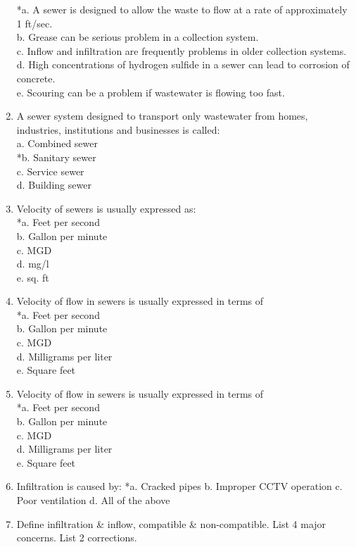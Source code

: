 \begin{enumerate}
*a. A sewer is designed to allow the waste to flow at a rate of approximately 1 ft/sec. \\
b. Grease can be serious problem in a collection system. \\
c. Inflow and infiltration are frequently problems in older collection systems. \\
d. High concentrations of hydrogen sulfide in a sewer can lead to corrosion of concrete. \\
e. Scouring can be a problem if wastewater is flowing too fast. \\

\item  A sewer system designed to transport only wastewater from homes, industries, institutions and businesses is called: \\

a. Combined sewer \\
*b. Sanitary sewer \\
c. Service sewer \\
d. Building sewer \\

\item  Velocity of sewers is usually expressed as: \\

*a. Feet per second \\
b. Gallon per minute \\
c. MGD \\
d. mg/l \\
e. sq. ft \\

\item  Velocity of flow in sewers is usually expressed in terms of \\

*a. Feet per second \\
b. Gallon per minute \\
c. MGD \\
d. Milligrams per liter \\
e. Square feet \\

\item  Velocity of flow in sewers is usually expressed in terms of \\

*a. Feet per second \\
b. Gallon per minute \\
c. MGD \\
d. Milligrams per liter \\
e. Square feet \\

\item Infiltration is caused by:
*a. Cracked pipes
b. Improper CCTV operation
c. Poor ventilation
d. All of the above



\item Define infiltration \& inflow, compatible \& non-compatible. List 4 major concerns.  List 2 corrections.


\end{enumerate}